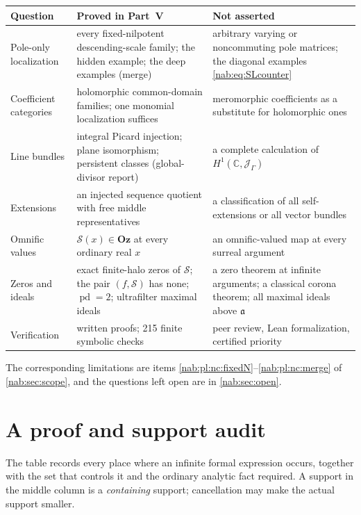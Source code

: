 \documentclass[11pt,letterpaper]{article}
\theoremstyle{definition}
\theoremstyle{remark}
\newcommand{\C}{\mathbb C}
\newcommand{\JJ}{\mathscr J_\Gamma}
\newcommand{\Oz}{\mathbf{Oz}}
\numberwithin{equation}{section}
\begin{document}
\begin{center}\small
\begin{tabular}{@{}L{0.22\textwidth}L{0.35\textwidth}L{0.35\textwidth}@{}}
\toprule
Question & Proved in Part~V & Not asserted\\
\midrule
Pole-only localization & every fixed-nilpotent descending-scale family; the
hidden example; the deep examples (merge) & arbitrary varying or noncommuting
pole matrices; the diagonal examples \eqref{nab:eq:SLcounter}\\[0.3em]
Coefficient categories & holomorphic common-domain families; one monomial
localization suffices & meromorphic coefficients as a substitute for
holomorphic ones\\[0.3em]
Line bundles & integral Picard injection; plane isomorphism; persistent
classes (global-divisor report) & a complete calculation of
$H^1(\C,\JJ)$\\[0.3em]
Extensions & an injected sequence quotient with free middle representatives &
a classification of all self-extensions or all vector bundles\\[0.3em]
Omnific values & $\mathcal S(x)\in\Oz$ at every ordinary real $x$ & an
omnific-valued map at every surreal argument\\[0.3em]
Zeros and ideals & exact finite-halo zeros of $\mathcal S$; the pair
$(f,\mathcal S)$ has none; $\operatorname{pd}=2$; ultrafilter maximal ideals &
a zero theorem at infinite arguments; a classical corona theorem; all maximal
ideals above $\mathfrak a$\\[0.3em]
Verification & written proofs; 215 finite symbolic checks & peer review, Lean
formalization, certified priority\\
\bottomrule
\end{tabular}
\end{center}
The corresponding limitations are items
\ref{nab:pl:nc:fixedN}--\ref{nab:pl:nc:merge} of \cref{nab:sec:scope}, and the
questions left open are in \cref{nab:sec:open}.

\appendix
{}

\section{A proof and support audit}\label{nab:app:audit}

The table records every place where an infinite formal expression occurs,
together with the set that controls it and the ordinary analytic fact required.
A support in the middle column is a \emph{containing} support; cancellation may
make the actual support smaller.
\end{document}
